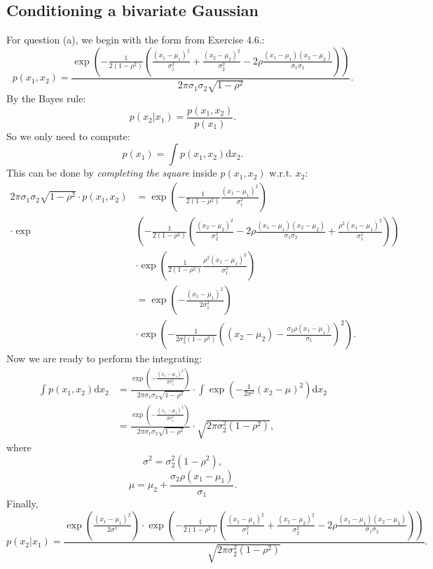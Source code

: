 \documentclass[UTF8]{ctexart}
\begin{document}
\subsection{Conditioning a bivariate Gaussian}
For question (a), we begin with the form from Exercise 4.6.:
$$p(x_{1},x_{2})=\frac{\exp\left(-\frac{1}{2(1-\rho^{2})}\left(\frac{(x_{1}-\mu_{1})^{2}}{\sigma^{2}_{1}}+\frac{(x_{2}-\mu_{2})^{2}}{\sigma^{2}_{2}}-2\rho\frac{(x_{1}-\mu_{1})(x_{2}-\mu_{2})}{\sigma_{1}\sigma_{2}} \right) \right)}{2\pi\sigma_{1}\sigma_{2}\sqrt{1-\rho^{2}}}.$$
By the Bayes rule:
$$p(x_{2}|x_{1})=\frac{p(x_{1},x_{2})}{p(x_{1})}.$$
So we only need to compute:
$$p(x_{1})=\int p(x_{1},x_{2}) \text{d}x_{2}.$$
This can be done by \emph{completing the square} inside $p(x_{1},x_{2})$ w.r.t. $x_{2}$:
$$
\begin{aligned}
2\pi\sigma_{1}\sigma_{2}\sqrt{1-\rho^{2}}\cdot p(x_{1},x_{2})&=\exp\left(-\frac{1}{2(1-\rho^{2})}\frac{(x_{1}-\mu_{1})^{2}}{\sigma^{2}_{1}} \right)\\
\cdot\exp&\left(-\frac{1}{2(1-\rho^{2})}\left(\frac{(x_{2}-\mu_{2})^{2}}{\sigma^{2}_{2}}-2\rho\frac{(x_{1}-\mu_{1})(x_{2}-\mu_{2})}{\sigma_{1}\sigma_{2}}+\frac{\rho^{2}(x_{1}-\mu_{1})^{2}}{\sigma^{2}_{1}} \right) \right)\\
&\cdot \exp\left(\frac{1}{2(1-\rho^{2})}\frac{\rho^{2}(x_{1}-\mu_{1})^{2}}{\sigma_{1}^{2}} \right)\\
&=\exp\left( -\frac{(x_{1}-\mu_{1})^{2}}{2\sigma^{2}_{1}}\right)\\
&\cdot \exp\left(-\frac{1}{2\sigma_{2}^{2}(1-\rho^{2})}\left((x_{2}-\mu_{2})-\frac{\sigma_{2}\rho(x_{1}-\mu_{1})}{\sigma_{1}} \right)^{2} \right).
\end{aligned}
$$
Now we are ready to perform the integrating:
$$
\begin{aligned}
\int p(x_{1},x_{2})\text{d}x_{2}&=\frac{\exp\left(-\frac{(x_{1}-\mu_{1})^{2}}{2\sigma^{2}_{1}} \right)}{2\pi\sigma_{1}\sigma_{2}\sqrt{1-\rho^{2}}}\cdot\int \exp\left(-\frac{1}{2 \sigma^{2}}(x_{2}-\mu)^{2} \right)\text{d}x_{2} \\
&=\frac{\exp\left(-\frac{(x_{1}-\mu_{1})^{2}}{2\sigma^{2}_{1}} \right)}{2\pi\sigma_{1}\sigma_{2}\sqrt{1-\rho^{2}}}\cdot \sqrt{2\pi\sigma^{2}_{2}(1-\rho^{2})},
\end{aligned}
$$
where
$$\sigma^{2}=\sigma^{2}_{2}(1-\rho^{2}),$$
$$\mu=\mu_{2}+\frac{\sigma_{2}\rho(x_{1}-\mu_{1})}{\sigma_{1}}.$$
Finally,
$$p(x_{2}|x_{1})=\frac{\exp\left(\frac{(x_{1}-\mu_{1})^{2}}{2\sigma^{1}}\right)\cdot \exp\left(-\frac{1}{2(1-\rho^{2})}\left(\frac{(x_{1}-\mu_{1})^{2}}{\sigma^{2}_{1}}+\frac{(x_{2}-\mu_{2})^{2}}{\sigma^{2}_{2}}-2\rho\frac{(x_{1}-\mu_{1})(x_{2}-\mu_{2})}{\sigma_{1}\sigma_{2}} \right) \right)}{\sqrt{2\pi\sigma^{2}_{2}(1-\rho^{2})}}.$$
\end{document}
